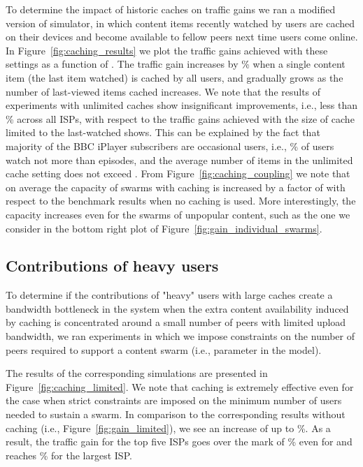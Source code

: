 \documentclass[10pt, conference, letterpaper]{IEEEtran}
\begin{document}
	
To determine the impact of historic caches on traffic gains we ran a modified version of simulator, in which  content items recently watched by users are cached on their devices and become available to fellow peers next time users come online. In Figure~\ref{fig:caching_results} we plot the traffic gains achieved with these settings as a function of . The traffic gain increases by  \% when a single content item (the last item watched) is cached by all users, and gradually grows as the number of last-viewed items cached increases. We note that the results of experiments with unlimited caches show insignificant improvements, i.e., less than \% across all ISPs, with respect to the traffic gains achieved with the size of cache limited to the  last-watched shows. This can be explained by the fact that majority of the BBC iPlayer subscribers are occasional users, i.e., \% of users watch not more than  episodes, and the average number of items in the unlimited cache setting does not exceed . From Figure~\ref{fig:caching_coupling} we note that on average the capacity of swarms with caching is increased by a factor of  with respect to the benchmark results when no caching is used. More interestingly, the capacity increases even for the swarms of unpopular content, such as the one we consider in the bottom right plot of Figure~\ref{fig:gain_individual_swarms}.





\subsection{Contributions of heavy users}






To determine if the contributions of "heavy" users with large caches create a bandwidth bottleneck in the system when the extra content availability induced by caching is concentrated around a small number of peers with limited upload bandwidth, we ran experiments in which we impose constraints on the number of peers required to support a content swarm (i.e., parameter  in the model). 

The results of the corresponding simulations are presented in Figure~\ref{fig:caching_limited}. We note that caching is extremely effective even for the case when strict constraints are imposed on the minimum number of users needed to sustain a swarm. In comparison  to the corresponding results without caching (i.e., Figure~\ref{fig:gain_limited}), we see an increase of up to \%. As a result, the traffic gain for the top five ISPs goes over the mark of \% even for  and reaches \% for the largest ISP. 
\end{document}
